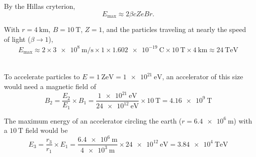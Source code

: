 By the Hillas cryterion,
\begin{equation}
  E_\text{max} \approx 2 \beta c Z e B r.
\end{equation}

With $r=\SI{4}{\kilo\meter}$, $B=\SI{10}{\tesla}$, $Z=1$, and the particles traveling at nearly the speed of light ($\beta\rightarrow 1$),
\begin{align}
  E_\text{max} \approx 2
    \times \SI{3e8}{\meter\per\second} 
    \times 1
    \times \SI{1.602e-19}{\coulomb}
    \times \SI{10}{\tesla}
    \times \SI{4}{\kilo\meter}
  \approx \boxed{ \SI{24}{\tera\electronvolt} }
\end{align}

 \\

To accelerate particles to $E=\SI{1}{\zetta\electronvolt}=\SI{1e21}{\electronvolt}$, an accelerator of this size would need a magnetic field of
\begin{equation}
  B_2 = \frac{E_2}{E_1} \times B_1
      = \frac{\SI{1e21}{\electronvolt}}{\SI{24e12}{\electronvolt}} \times \SI{10}{\tesla}
      = \boxed{ \SI{4.16e9}{\tesla} }
\end{equation}

The maximum energy of an accelerator circling the earth ($r=\SI{6.4e6}{\meter}$) with a $\SI{10}{\tesla}$ field would be
\begin{equation}
  E_3 = \frac{r_3}{r_1} \times E_1
      = \frac{\SI{6.4e6}{\meter}}{\SI{4e3}{\meter}} \times \SI{24e12}{\electronvolt}
      = \boxed{ \SI{3.84e4}{\tera\electronvolt} }
\end{equation}

